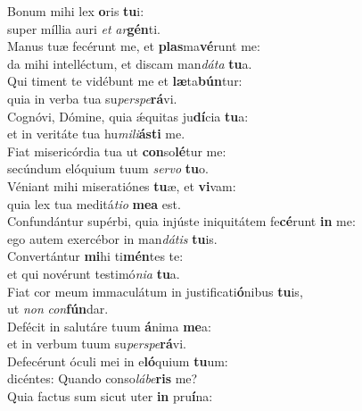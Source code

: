 \evenverse Bonum mihi lex \textbf{o}ris \textbf{tu}i:~\*\\
\evenverse super míllia auri \textit{et} \textit{ar}\textbf{gén}ti.\\
\oddverse Manus tuæ fecérunt me, et \textbf{plas}ma\textbf{vé}runt me:~\*\\
\oddverse da mihi intelléctum, et discam man\textit{dá}\textit{ta} \textbf{tu}a.\\
\evenverse Qui timent te vidébunt me et \textbf{læ}ta\textbf{bún}tur:~\*\\
\evenverse quia in verba tua su\textit{per}\textit{spe}\textbf{rá}vi.\\
\oddverse Cognóvi, Dómine, quia ǽquitas ju\textbf{dí}cia \textbf{tu}a:~\*\\
\oddverse et in veritáte tua hu\textit{mi}\textit{li}\textbf{á}\textbf{sti} me.\\
\evenverse Fiat misericórdia tua ut \textbf{con}so\textbf{lé}tur me:~\*\\
\evenverse secúndum elóquium tuum \textit{ser}\textit{vo} \textbf{tu}o.\\
\oddverse Véniant mihi miseratiónes \textbf{tu}æ, et \textbf{vi}vam:~\*\\
\oddverse quia lex tua meditá\textit{ti}\textit{o} \textbf{me}\textbf{a} est.\\
\evenverse Confundántur supérbi, quia injúste iniquitátem fe\textbf{cé}runt \textbf{in} me:~\*\\
\evenverse ego autem exercébor in man\textit{dá}\textit{tis} \textbf{tu}is.\\
\oddverse Convertántur \textbf{mi}hi ti\textbf{mén}tes te:~\*\\
\oddverse et qui novérunt testimó\textit{ni}\textit{a} \textbf{tu}a.\\
\evenverse Fiat cor meum immaculátum in justificati\textbf{ó}nibus \textbf{tu}is,~\*\\
\evenverse ut \textit{non} \textit{con}\textbf{fún}dar.\\
\oddverse Defécit in salutáre tuum \textbf{á}nima \textbf{me}a:~\*\\
\oddverse et in verbum tuum su\textit{per}\textit{spe}\textbf{rá}vi.\\
\evenverse Defecérunt óculi mei in e\textbf{ló}quium \textbf{tu}um:~\*\\
\evenverse dicéntes: Quando conso\textit{lá}\textit{be}\textbf{ris} me?\\
\oddverse Quia factus sum sicut uter \textbf{in} pru\textbf{í}na:~\*\\
